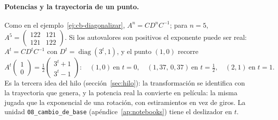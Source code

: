 \paragraph{Potencias y la trayectoria de un punto.} Como en el
ejemplo~\ref{ej:cb-diagonalizar}, \(A^n=CD^nC^{-1}\); para \(n=5\),
\(A^5=\left(\begin{smallmatrix}122&121\\121&122\end{smallmatrix}\right)\).
Si los autovalores son positivos el exponente puede ser real:
\(A^t=CD^tC^{-1}\) con \(D^t=\operatorname{diag}(3^t,1)\), y el punto \((1,0)\) recorre
\[
  A^t\begin{pmatrix}1\\0\end{pmatrix}=\tfrac12\begin{pmatrix}3^t+1\\3^t-1\end{pmatrix}:
  \quad(1,0)\ \text{en } t=0,\quad(1{,}37,\,0{,}37)\ \text{en } t=\tfrac12,\quad(2,1)\ \text{en } t=1 .
\]
Es la tercera idea del hilo (sección~\ref{sec:hilo}): la transformación se identifica con
la trayectoria que genera, y la potencia real la convierte en película: la misma jugada que
la exponencial de una rotación, con estiramientos en vez de giros. La unidad
\texttt{08\_cambio\_de\_base} (apéndice~\ref{ap:notebooks}) tiene el deslizador en \(t\).

